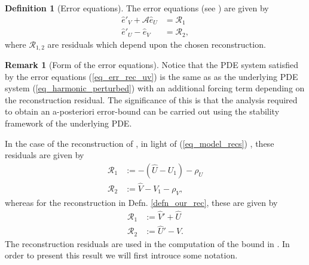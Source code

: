 \documentclass[12pt,a4paper]{article}
\numberwithin{equation}{section}
\theoremstyle{definition}
\newcommand{\qp}[1]{\left(#1\right)}
\newtheorem{Defn}[subsection]{Definition}
\newtheorem{Rem}[subsection]{Remark}
\begin{document}
\begin{Defn}[Error equations]
The error equations (see \cite[eq. 3.2]{georgoulis2016posteriori}) are given by 
\begin{equation}\label{eq_error_eqs}
\begin{aligned}
\hat{e}'_V+\mathcal{A}\hat{e}_U&=\mathcal{R}_1\\
\hat{e}'_U-\hat{e}_V&=\mathcal{R}_2,
\end{aligned}
\end{equation}
where  $\mathcal{R}_{1,2}$ are residuals which depend upon the chosen reconstruction.
\end{Defn}
\begin{Rem}[Form of the error equations]
Notice that the PDE system satisfied by the error equations (\ref{eq_err_rec_uv}) is the same as as the underlying PDE system (\ref{eq_harmonic_perturbed}) with an additional forcing term depending on the reconstruction residual.  The significance of this is that the analysis required to obtain an a-posteriori error-bound can be carried out using the stability framework of the underlying PDE.
\end{Rem}
 In the case of the reconstruction of \cite{georgoulis2016posteriori}, in light of (\ref{eq_model_recs}) , these residuals are given by
\begin{equation}\label{eq_residuals_paper}
\begin{aligned}
\mathcal{R}_1&:=-\left(\hat{U}-U_1\right)-\rho_U\\
\mathcal{R}_2&:=\hat{V}-V_1-\rho_V,
\end{aligned}
\end{equation}
whereas for the reconstruction in Defn. \ref{defn_our_rec}, these are given by
\begin{equation}\label{eq_residuals_our}
\begin{aligned}
\mathcal{R}_1&:=\hat{V}'+\hat{U}\\
\mathcal{R}_2&:=\hat{U}'-\hat{V}.
\end{aligned}
\end{equation}
The reconstruction residuals are used in the computation of the bound in \cite[Thm 3.1]{georgoulis2016posteriori}. In order to present this result we will first introuce some notation.
\end{document}
